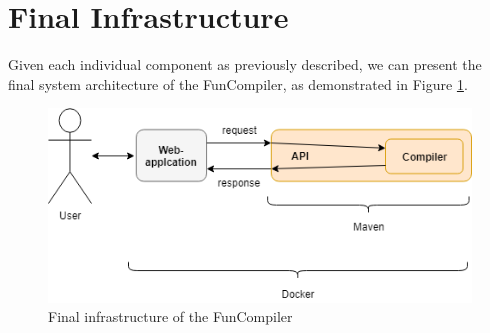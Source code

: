 \documentclass{l4proj}
\begin{document}
\section{Final Infrastructure} 
Given each individual component as previously described, we can present the final system architecture of the FunCompiler, as demonstrated in Figure \ref{fig:finalinfra}.
\begin{figure}[h]
\centering
\includegraphics[scale=0.6]{images/finalinfra.png}
\caption{Final infrastructure of the FunCompiler}
\label{fig:finalinfra}	
\end{figure}



\begin{appendices}

\end{appendices}




\end{document}
